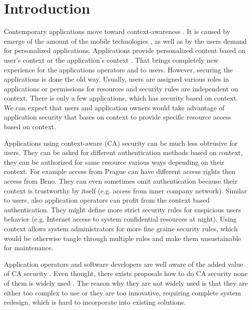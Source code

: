 \documentclass{poster15}
\begin{document}

\section{Introduction}

Contemporary applications move toward context-awareness \cite{context,tomas1}. It is caused by emerge of the amount of the mobile technologies \cite{mobilecontext}, as well as by the users demand for personalized applications. Applications provide personalized content based on user's context or the application's context \cite{personalizedcontext}. That brings completely new experience for the applications operators and to users. However, securing the applications is done the old way. Usually, users are assigned various roles in applications or permissions for resources and security rules are independent on context. There is only a few applications, which has security based on context. We can expect that users and application owners would take advantage of application security that bases on context to provide specific resource access based on context.

Applications using context-aware (CA) security can be much less obtrusive for users. They can be asked for different authentication methods based on context, they can be authorized for same resource various ways depending on their context. For example access from Prague can have different access rights then access from Brno.  They can even sometimes omit authentication because their context is trustworthy by itself (e.g. access from inner company network). Similar to users, also application operators can profit from the context based authentication. They might define more strict security rules for suspicious users behavior (e.g. Internet access to system confidential resources at night). Using context allows system administrators for more fine graine security rules, which would be otherwise tangle through multiple rules and make them unsustainable for maintenance. 

Application operators and software developers are well aware of the added value of CA security . Even thought, there exists proposals how to do CA security none of them is widely used \cite{grbac,envroles,contextroles,contextaccess,contextawarerbac,xorbac,genericcontext,ubiscom,hung,wendong}. The reason why they are not widely used is that they are either too complex to use or they are too innovative, requiring complete system redesign, which is hard to incorporate into existing solutions.
\end{document}
